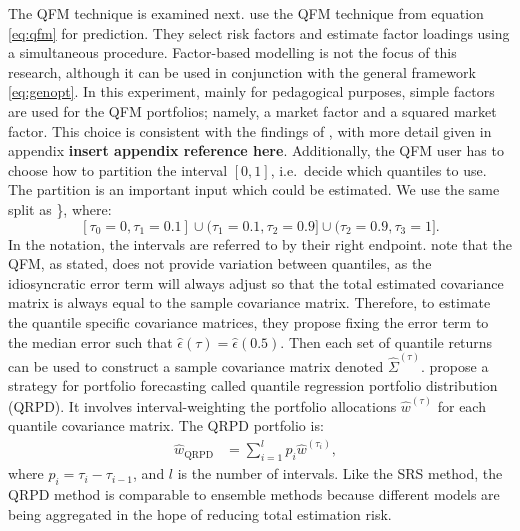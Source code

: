\documentclass[
]{article}
\begin{document}
The QFM technique is examined next. \citet{CDG19} use the QFM technique from equation \eqref{eq:qfm} for
prediction. They select risk factors and estimate factor loadings using a simultaneous procedure.
Factor-based modelling is not the focus of this research, although it can be used in conjunction with
the general framework \eqref{eq:genopt}. In this experiment, mainly for pedagogical purposes, simple
factors are used for the QFM portfolios; namely, a market factor and a squared market factor. This
choice is consistent with the findings of \citet{TM66}, with more detail given in appendix
\textbf{insert appendix reference here}. Additionally, the QFM user has to choose how to partition the
interval \([0, 1]\), i.e.~decide which quantiles to use. The partition is an important input which could
be estimated. We use the same split as \citet{MP08}\}, where: \[[\tau_0 = 0, \tau_1 = 0.1]\cup(\tau_1 = 0.1,
\tau_2 = 0.9] \cup (\tau_2 = 0.9, \tau_3 = 1].\] In the notation, the intervals are referred to by
their right endpoint. \citet{FD18} note that the QFM, as stated, does not provide variation between
quantiles, as the idiosyncratic error term will always adjust so that the total estimated covariance
matrix is always equal to the sample covariance matrix. Therefore, to estimate the quantile specific
covariance matrices, they propose fixing the error term to the median error such that
\(\hat{\epsilon}(\tau) = \hat{\epsilon}(0.5)\). Then each set of quantile returns can be used to
construct a sample covariance matrix denoted \(\hat{\Sigma}^{(\tau)}\). \citet{MP08} propose a strategy for
portfolio forecasting called quantile regression portfolio distribution (QRPD). It involves
interval-weighting the portfolio allocations \(\hat{w}^{(\tau)}\) for each quantile covariance matrix.
The QRPD portfolio is:
\begin{align}
\hat{w}_{\text{QRPD}} & = \sum_{i = 1}^{l} p_i\hat{w}^{(\tau_i)},\;\;
\end{align}
where \(p_i = \tau_i - \tau_{i - 1}\), and \(l\) is the number of intervals. Like the SRS method, the QRPD
method is comparable to ensemble methods because different models are being aggregated in the hope of
reducing total estimation risk.
\end{document}
